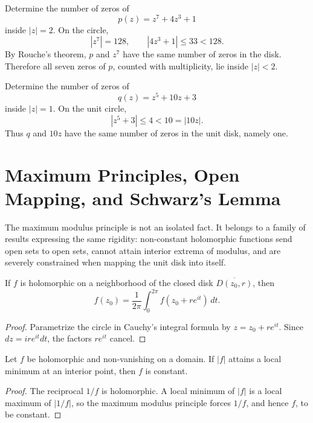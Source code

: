 \begin{example}
Determine the number of zeros of
\[
    p(z)=z^7+4z^3+1
\]
inside $|z|=2$. On the circle,
\[
    |z^7|=128,
    \qquad
    |4z^3+1|\leq33<128.
\]
By Rouche's theorem, $p$ and $z^7$ have the same number of zeros in the disk. Therefore all seven zeros of $p$, counted with multiplicity, lie inside $|z|<2$.
\end{example}

\begin{example}
Determine the number of zeros of
\[
    q(z)=z^5+10z+3
\]
inside $|z|=1$. On the unit circle,
\[
    |z^5+3|\leq4<10=|10z|.
\]
Thus $q$ and $10z$ have the same number of zeros in the unit disk, namely one.
\end{example}

\section{Maximum Principles, Open Mapping, and Schwarz's Lemma}

The maximum modulus principle is not an isolated fact. It belongs to a family of results expressing the same rigidity: non-constant holomorphic functions send open sets to open sets, cannot attain interior extrema of modulus, and are severely constrained when mapping the unit disk into itself.

\begin{theorem}
If $f$ is holomorphic on a neighborhood of the closed disk $\overline{D(z_0,r)}$, then
\[
    f(z_0)=\frac{1}{2\pi}\int_0^{2\pi}f(z_0+re^{it})\,dt.
\]
\end{theorem}

\begin{proof}
Parametrize the circle in Cauchy's integral formula by $z=z_0+re^{it}$. Since $dz=ire^{it}dt$, the factors $re^{it}$ cancel.
\end{proof}

\begin{theorem}
Let $f$ be holomorphic and non-vanishing on a domain. If $|f|$ attains a local minimum at an interior point, then $f$ is constant.
\end{theorem}

\begin{proof}
The reciprocal $1/f$ is holomorphic. A local minimum of $|f|$ is a local maximum of $|1/f|$, so the maximum modulus principle forces $1/f$, and hence $f$, to be constant.
\end{proof}

